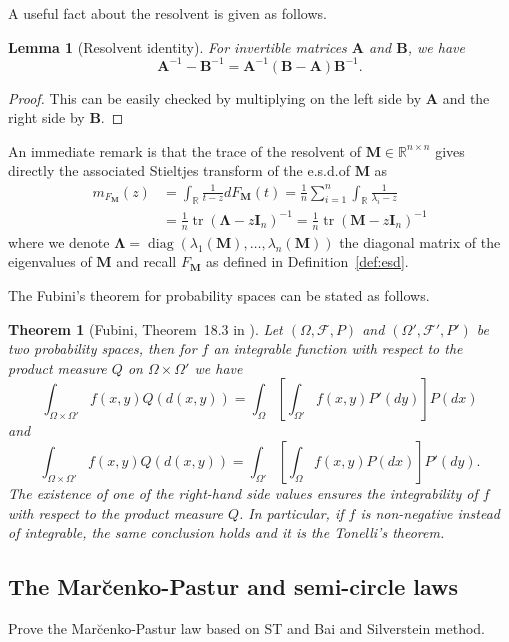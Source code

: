 \documentclass[MAL,biber]{nowfnt} %
\newtheorem{Theorem}{Theorem}
\newtheorem{Lemma}{Lemma}
\DeclareMathOperator{\tr}{tr}
\DeclareMathOperator{\diag}{diag}
\newcommand{\A}{{\mathbf{A}}}
\newcommand{\B}{{\mathbf{B}}}
\newcommand{\I}{{\mathbf{I}}}
\newcommand{\M}{{\mathbf{M}}}
\newcommand{\bLambda}{{ \boldsymbol{\Lambda} }}
\newcommand{\RR}{{\mathbb{R}}}
\begin{document}
A useful fact about the resolvent is given as follows.
\begin{Lemma}[Resolvent identity]
For invertible matrices $\A$ and $\B$, we have
\[
	\A^{-1} - \B^{-1} = \A^{-1} (\B - \A) \B^{-1}.
\]
\end{Lemma}
\begin{proof}
This can be easily checked by multiplying on the left side by $\A$ and the right side by $\B$.
\end{proof}

An immediate remark is that the trace of the resolvent of $\M \in \RR^{n \times n}$ gives directly the associated Stieltjes transform of the e.s.d.\@ of $\M$ as
\begin{align*}
	m_{F_\M}(z) &= \int_\RR \frac1{t - z} dF_{\M}(t) = \frac1n \sum_{i=1}^n \int_\RR \frac1{\lambda_i - z} \\
	&= \frac1n \tr \left( \bLambda - z \I_n \right)^{-1} = \frac1n \tr \left( \M - z \I_n \right)^{-1}
\end{align*}
where we denote $\bLambda = \diag(\lambda_1(\M), \ldots, \lambda_n(\M))$ the diagonal matrix of the eigenvalues of $\M$ and recall $F_{\M}$ as defined in Definition~\ref{def:esd}.

The Fubini's theorem for probability spaces can be stated as follows.
\begin{Theorem}[Fubini, Theorem~18.3 in \citep{billingsley2012probability}]\label{theo:fubini}
Let $(\Omega, \mathcal{F}, P)$ and $(\Omega', \mathcal{F}', P')$ be two probability spaces, then for $f$ an integrable function with respect to the product measure $Q$ on $\Omega \times \Omega'$ we have
\[
	\int_{\Omega \times \Omega'} f(x,y) Q(d(x,y)) = \int_{\Omega} \left[ \int_{\Omega'} f(x,y) P'(dy) \right] P(dx)
\]
and
\[
	\int_{\Omega \times \Omega'} f(x,y) Q(d(x,y)) = \int_{\Omega'} \left[ \int_{\Omega} f(x,y) P(dx) \right] P'(dy).
\]
The existence of one of the right-hand side values ensures the integrability of $f$ with respect to the product measure $Q$. In particular, if $f$ is non-negative instead of integrable, the same conclusion holds and it is the Tonelli's theorem.
\end{Theorem}

\subsection{The Mar{\u c}enko-Pastur and semi-circle laws}

Prove the Mar{\u{c}}enko-Pastur law \citep{marvcenko1967distribution} based on ST and Bai and Silverstein method.
\end{document}
